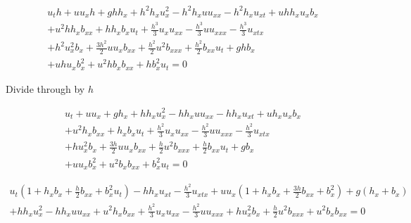 \documentclass[12pt]{article}
\begin{document}
\begin{multline*}
u_th + uu_xh + ghh_x  + h^2h_xu_x^2 - h^2h_xuu_{xx}  - h^2h_xu_{xt} + uhh_xu_xb_x \\ + u^2hh_xb_{xx} + hh_xb_xu_t  + \frac{h^3}{3}u_xu_{xx} - \frac{h^3}{3}u u_{xxx} - \frac{h^3}{3}u_{xtx}  \\ +  h^2u_x^2b_x  + \frac{3h^2}{2}uu_xb_{xx}+ \frac{h^2}{2}u^2b_{xxx}  + \frac{h^2}{2}b_{xx}u_t   + gh b_x \\  + uh u_xb_x^2 + u^2 h b_xb_{xx} + h b_x^2u_t = 0
\end{multline*}

Divide through by $h$

\begin{multline*}
u_t+ uu_x + gh_x  + hh_xu_x^2 - hh_xuu_{xx}  - hh_xu_{xt} + uh_xu_xb_x \\ + u^2h_xb_{xx} + h_xb_xu_t  + \frac{h^2}{3}u_xu_{xx} - \frac{h^2}{3}u u_{xxx} - \frac{h^2}{3}u_{xtx}  \\ +  hu_x^2b_x  + \frac{3h}{2}uu_xb_{xx}+ \frac{h}{2}u^2b_{xxx}  + \frac{h}{2}b_{xx}u_t   + gb_x \\  + u u_xb_x^2 + u^2 b_xb_{xx} +  b_x^2u_t = 0
\end{multline*}

\begin{multline*}
u_t\left(1 + h_xb_x + \frac{h}{2}b_{xx} + b_x^2u_t \right) - hh_xu_{xt} - \frac{h^2}{3}u_{xtx} + uu_x\left(1 + h_xb_x + \frac{3h}{2}b_{xx} + b_x^2 \right) + g\left(h_x + b_x\right) \\ + hh_xu_x^2 - hh_xuu_{xx} + u^2h_xb_{xx}  + \frac{h^2}{3}u_xu_{xx} - \frac{h^2}{3}u u_{xxx}  +  hu_x^2b_x + \frac{h}{2}u^2b_{xxx}  + u^2 b_xb_{xx} = 0
\end{multline*}
\end{document}
